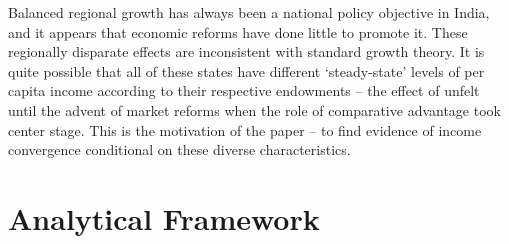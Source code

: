 \documentclass[a4paper, 11pt]{article}
\begin{document}
    
Balanced regional growth has always been a national policy objective in India, and it appears that economic reforms have done little to promote it.  These regionally disparate  effects are inconsistent with standard growth theory.  It is quite possible that all of these states have different ‘steady-state’ levels of per capita income according to their respective endowments -- the effect of unfelt until the advent of market reforms when the role of comparative advantage took center stage.  This is the motivation of the paper -- to find evidence of income convergence conditional on these diverse characteristics.  \par

\section{Analytical Framework}
\end{document}
